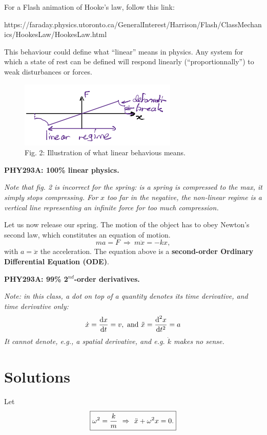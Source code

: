 \documentclass[11pt]{article}
\makeatletter
\def\maxwidth{\ifdim\Gin@nat@width>\linewidth\linewidth
    \else\Gin@nat@width\fi}
\let\Oldincludegraphics\includegraphics
\renewcommand{\includegraphics}[1]{\Oldincludegraphics[width=.8\maxwidth]{#1}}
\makeatother
\begin{document}
    For a Flash animation of Hooke's law, follow this link:

https://faraday.physics.utoronto.ca/GeneralInterest/Harrison/Flash/ClassMechanics/HookesLaw/HookesLaw.html

    This behaviour could define what ``linear'' means in physics. Any system
for which a state of rest can be defined will respond linearly
(``proportionnally'') to weak disturbances or forces.

\begin{figure}
\centering
\includegraphics{Linear.png}
\caption{Fig. 2: Illustration of what linear behavious means.}
\end{figure}

\textbf{PHY293A: 100\% linear physics.}

\emph{Note that fig. 2 is incorrect for the spring: is a spring is
compressed to the max, it simply stops compressing. For \(x\) too far in
the negative, the non-linear regime is a vertical line representing an
infinite force for too much compression.}

    Let us now release our spring. The motion of the object has to obey
Newton's second law, which constitutes an equation of motion.
\[ ma = F\ \Rightarrow\ m\ddot{x} = -kx, \] with \(a = \ddot{x}\) the
acceleration. The equation above is a \textbf{second-order Ordinary
Differential Equation (ODE)}.

\textbf{PHY293A: 99\% 2}\(^{nd}\)\textbf{-order derivatives.}

\emph{Note: in this class, a dot on top of a quantity denotes its time
derivative, and time derivative only:}
\[ \dot{x} = \frac{\textrm{d} {x}}{\textrm{d} {t}} = v, \ \textrm{and}\ \ddot x = \frac{\textrm{d}^{2} {x}}{\textrm{d} {t}^{2}} = a \]
\emph{It cannot denote, e.g., a spatial derivative, and e.g. \(\dot k\)
makes no sense.}

    \hypertarget{solutions}{%
\section{Solutions}\label{solutions}}

Let
\[\boxed{ \large \omega^2 = \frac{k}{m} \ \Rightarrow \ \ddot{x} + \omega^2 x = 0.} \]
\end{document}
